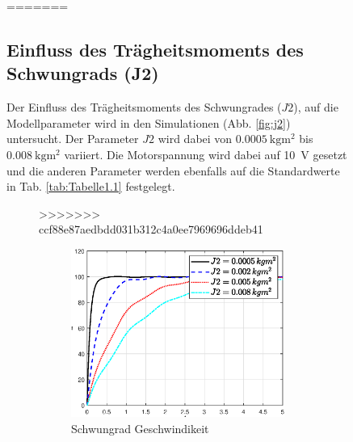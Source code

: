 \begin{figure}
=======
\subsection*{Einfluss des Trägheitsmoments des Schwungrads (J2)}
Der Einfluss des Trägheitsmoments des Schwungrades ($J2$), auf die Modellparameter wird in den Simulationen (Abb. \ref{fig:j2}) untersucht. 
Der Parameter $J2$ wird dabei von $\SI{0.0005}{\kg\m^2}$ bis $\SI{0.008}{\kg\m^2}$ variiert.
Die Motorspannung wird dabei auf \SI{10}{\volt} gesetzt und die anderen Parameter werden ebenfalls auf die Standardwerte in Tab. \ref{tab:Tabelle1.1} festgelegt.\\
\pagebreak

\begin{figure}
>>>>>>> ccf88e87aedbdd031b312c4a0ee7969696ddeb41
    \captionsetup[subfigure]{justification=centering,font=footnotesize}
    \begin{subfigure}[b]{0.49\linewidth}
        \includegraphics[width=\linewidth]{Bilder/5_sensi/fig/j2/phi_punkt.eps}
        \caption{Schwungrad Geschwindikeit}
        \label{fig:j2_phi_punkt}
    \end{subfigure}
    \begin{subfigure}[b]{0.49 \linewidth}

\end{subfigure}
\end{figure}
\end{figure}
